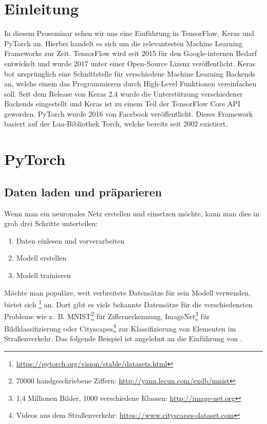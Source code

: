 \section{Einleitung}
In diesem Proseminar sehen wir uns eine Einführung in TensorFlow, Keras und PyTorch an. 
Hierbei handelt es sich um die relevantesten Machine Learning Frameworks zur Zeit. 
TensorFlow wird seit 2015 für den Google-internen Bedarf entwickelt und 
wurde 2017 unter einer Open-Source Lizenz veröffentlicht. 
Keras bot ursprünglich eine Schnittstelle für verschiedene Machine Learning Backends an, welche 
einem das Programmieren durch High-Level Funktionen vereinfachen soll. 
Seit dem Release von Keras 2.4 wurde die Unterstützung verschiedener 
Backends eingestellt und Keras ist zu einem Teil der TensorFlow Core API geworden. 
PyTorch wurde 2016 von Facebook veröffentlicht. Dieses Framework basiert auf 
der Lua-Bibliothek Torch, welche bereits seit 2002 existiert.

\section{PyTorch}
\subsection{Daten laden und präparieren}
Wenn man ein neuronales Netz erstellen und einsetzen möchte, kann man dies in grob 
drei Schritte unterteilen: 
\begin{enumerate}
    \item Daten einlesen und vorverarbeiten
    \item Modell erstellen
    \item Modell trainieren
\end{enumerate}
Möchte man populäre, weit verbreitete Datensätze für sein Modell verwenden, bietet sich 
\footnote{\url{https://pytorch.org/vision/stable/datasets.html}} 
an. Dort gibt es viele bekannte Datensätze für die verschiedensten Probleme 
wie z.~B. MNIST\footnote{70000 handgeschriebene Ziffern: \url{http://yann.lecun.com/exdb/mnist}} für Ziffernerkennung, 
ImageNet\footnote{1,4 Millionen Bilder, 1000 verschiedene Klassen: \url{http://image-net.org}} für Bildklassifizierung oder 
Cityscapes\footnote{Videos aus dem Straßenverkehr: \url{https://www.cityscapes-dataset.com}} 
zur Klassifizierung von Elementen im Straßenverkehr. 
Das folgende Beispiel ist angelehnt an die Einführung von \cite{mahmood:2019}.

